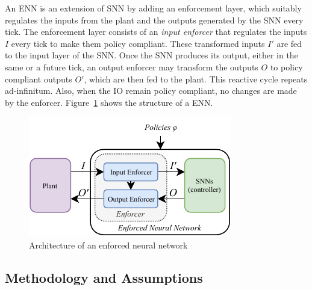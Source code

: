 An \ac{ENN} is an extension of \ac{SNN} by adding an enforcement
layer, which suitably regulates the inputs from the plant and the
outputs generated by the \ac{SNN} every tick. The enforcement layer
consists of an \emph{input enforcer} that regulates the inputs $I$ every
tick to make them policy compliant. These transformed inputs $I'$ are
fed to the input layer of the \ac{SNN}. Once the \ac{SNN} produces its
output, either in the same or a future tick, an output enforcer may
transform the outputs $O$ to policy compliant outputs $O'$, which are
then fed to the plant. This reactive cycle repeats ad-infinitum. Also,
when the IO remain policy compliant, no changes are made by the enforcer.
Figure~\ref{fig:rebasic} shows the structure of a \ac{ENN}.

\begin{figure}[!htb]
	\centering
	\includegraphics[scale=1.0]{Content/fig/model-driven-ai-enns.pdf}
	\caption{Architecture of an enforced neural network}
	\label{fig:rebasic}
\end{figure}





\subsection{Methodology and Assumptions}

